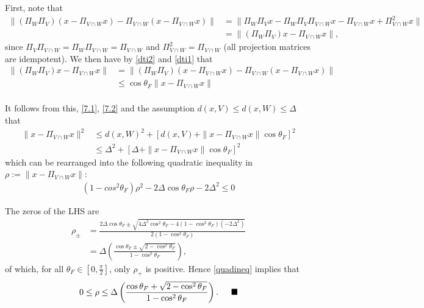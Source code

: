 \documentclass[journal,onecolumn]{IEEEtran}
\begin{document}
First, note that
\begin{align}\label{dti1}
\|(\Pi_W\Pi_V)(x - \Pi_{V \cap W}x) - \Pi_{V \cap W}(x - \Pi_{V \cap W}x)\| 
&= \| \Pi_W \Pi_V x - \Pi_W \Pi_V \Pi_{V \cap W} x - \Pi_{V \cap W} x + \Pi_{V \cap W}^2 x \| \nonumber \\
&= \|(\Pi_W \Pi_V) x - \Pi_{V \cap W} x \|,
\end{align}
%
since $\Pi_V \Pi_{V \cap W} = \Pi_W \Pi_{V \cap W} = \Pi_{V \cap W}$ and $\Pi_{V \cap W}^2 = \Pi_{V \cap W}$ (all projection matrices are idempotent). We then have by \eqref{dti2} and \eqref{dti1} that
\begin{align*}
\|(\Pi_W \Pi_V) x - \Pi_{V \cap W} x \| 
&= \|(\Pi_W\Pi_V)(x - \Pi_{V \cap W}x) - \Pi_{V \cap W}(x - \Pi_{V \cap W}x)\| \\
&\leq \cos\theta_F \|x - \Pi_{V \cap W}x\| \\
\end{align*}

It follows from this, \eqref{7.1}, \eqref{7.2} and the assumption $d(x,V) \leq d(x,W) \leq \Delta$ that
\begin{align*}
\|x - \Pi_{V \cap W}x\|^2 &\leq d(x, W)^2 + \left[ d(x, V) + \|x - \Pi_{V \cap W}x\| \cos\theta_F \right]^2 \\
&\leq \Delta^2 + \left[ \Delta + \|x - \Pi_{V \cap W}x\| \cos\theta_F \right]^2
\end{align*}
%
which can be rearranged into the following quadratic inequality in $\rho := \|x - \Pi_{V \cap W}x\|$:
\begin{align}\label{quadineq}
\left( 1 - cos^2\theta_F \right)\rho^2 - 2 \Delta \cos\theta_F\rho - 2 \Delta^2 \leq 0
\end{align}

The zeros of the LHS are
\begin{align*}
\rho_{\pm} &= \frac{ 2 \Delta \cos\theta_F \pm \sqrt{ 4\Delta^2\cos^2\theta_F - 4\left(1 - \cos^2\theta_F\right)\left(-2\Delta^2\right)} }{2 \left(1-\cos^2\theta_F\right)} \\
&= \Delta \left( \frac{ \cos\theta_F \pm \sqrt{2 - \cos^2\theta_F} }{1 - \cos^2\theta_F} \right),
\end{align*}
%
of which, for all $\theta_F \in [0, \frac{\pi}{2}]$, only $\rho_{+}$ is positive. Hence \eqref{quadineq} implies that
\begin{align*}
0 \leq \rho \leq \Delta \left( \frac{ \cos\theta_F + \sqrt{2 - \cos^2\theta_F} }{1 - \cos^2\theta_F} \right). \indent \blacksquare
\end{align*}
\end{document}
